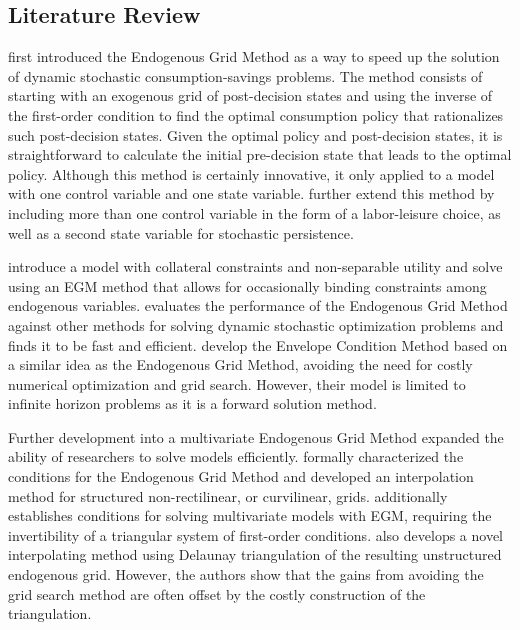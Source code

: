 \documentclass{article}
\begin{document}
\subsection{Literature Review}\label{Literature Review}



\citet{Carroll2006} first introduced the Endogenous Grid Method as a way to speed up the solution of dynamic stochastic consumption-savings problems. The method consists of starting with an exogenous grid of post-decision states and using the inverse of the first-order condition to find the optimal consumption policy that rationalizes such post-decision states. Given the optimal policy and post-decision states, it is straightforward to calculate the initial pre-decision state that leads to the optimal policy. Although this method is certainly innovative, it only applied to a model with one control variable and one state variable. \citet{Barillas2007} further extend this method by including more than one control variable in the form of a labor-leisure choice, as well as a second state variable for stochastic persistence.

\citet{Hintermaier2010} introduce a model with collateral constraints and non-separable utility and solve using an EGM method that allows for occasionally binding constraints among endogenous variables. \citet{Jorgensen2013} evaluates the performance of the Endogenous Grid Method against other methods for solving dynamic stochastic optimization problems and finds it to be fast and efficient. \citet{Maliar2013} develop the Envelope Condition Method based on a similar idea as the Endogenous Grid Method, avoiding the need for costly numerical optimization and grid search. However, their model is limited to infinite horizon problems as it is a forward solution method.

Further development into a multivariate Endogenous Grid Method expanded the ability of researchers to solve models efficiently. \citet{White2015} formally characterized the conditions for the Endogenous Grid Method and developed an interpolation method for structured non-rectilinear, or curvilinear, grids. \citet{Iskhakov2015} additionally establishes conditions for solving multivariate models with EGM, requiring the invertibility of a triangular system of first-order conditions. \citet{Ludwig2018} also develops a novel interpolating method using Delaunay triangulation of the resulting unstructured endogenous grid. However, the authors show that the gains from avoiding the grid search method are often offset by the costly construction of the triangulation.
\end{document}
